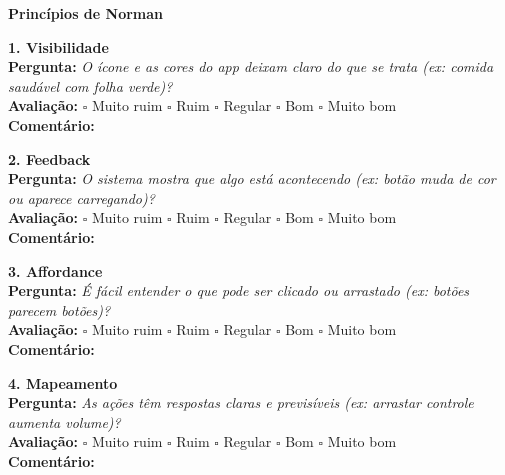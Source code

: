 \textbf{Princípios de Norman}

\textbf{1. Visibilidade} \\
\textbf{Pergunta:} \textit{O ícone e as cores do app deixam claro do que se trata (ex: comida saudável com folha verde)?} \\
\textbf{Avaliação:} $\square$ Muito ruim \hspace{0.5cm} $\square$ Ruim \hspace{0.5cm} $\square$ Regular \hspace{0.5cm} $\square$ Bom \hspace{0.5cm} $\square$ Muito bom \\
\textbf{Comentário:} \underline{\hspace{12cm}}

\textbf{2. Feedback} \\
\textbf{Pergunta:} \textit{O sistema mostra que algo está acontecendo (ex: botão muda de cor ou aparece carregando)?} \\
\textbf{Avaliação:} $\square$ Muito ruim \hspace{0.5cm} $\square$ Ruim \hspace{0.5cm} $\square$ Regular \hspace{0.5cm} $\square$ Bom \hspace{0.5cm} $\square$ Muito bom \\
\textbf{Comentário:} \underline{\hspace{12cm}}

\textbf{3. Affordance} \\
\textbf{Pergunta:} \textit{É fácil entender o que pode ser clicado ou arrastado (ex: botões parecem botões)?} \\
\textbf{Avaliação:} $\square$ Muito ruim \hspace{0.5cm} $\square$ Ruim \hspace{0.5cm} $\square$ Regular \hspace{0.5cm} $\square$ Bom \hspace{0.5cm} $\square$ Muito bom \\
\textbf{Comentário:} \underline{\hspace{12cm}}

\textbf{4. Mapeamento} \\
\textbf{Pergunta:} \textit{As ações têm respostas claras e previsíveis (ex: arrastar controle aumenta volume)?} \\
\textbf{Avaliação:} $\square$ Muito ruim \hspace{0.5cm} $\square$ Ruim \hspace{0.5cm} $\square$ Regular \hspace{0.5cm} $\square$ Bom \hspace{0.5cm} $\square$ Muito bom \\
\textbf{Comentário:} \underline{\hspace{12cm}}


